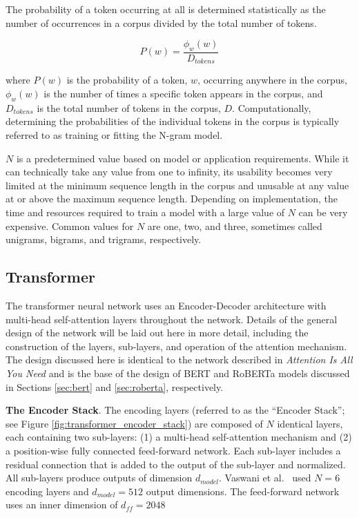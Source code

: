 \documentclass[12pt]{article}
\begin{document}
The probability of a token occurring at all is determined statistically as the number of occurrences in a corpus divided by the total number of tokens.

\begin{equation}\label{eq:ngram_prob_wj}
    P(w) = \frac{\phi_w(w)}{D_{tokens}}
\end{equation}

\noindent
where $P(w)$ is the probability of a token, $w$, occurring anywhere in the corpus, $\phi_w(w)$ is the number of times a specific token appears in the
corpus, and $D_{tokens}$ is the total number of tokens in the corpus, $D$. Computationally, determining the probabilities of the individual tokens in
the corpus is typically referred to as training or fitting the N-gram model.

$N$ is a predetermined value based on model or application requirements. While it can technically take any value from one to infinity, its usability
becomes very limited at the minimum sequence length in the corpus and unusable at any value at or above the maximum sequence length. Depending on
implementation, the time and resources required to train a model with a large value of $N$ can be very expensive. Common values for $N$ are one, two,
and three, sometimes called unigrams, bigrams, and trigrams, respectively.

\subsection{Transformer}\label{sec:transformer}
The transformer neural network uses an Encoder-Decoder architecture with multi-head self-attention layers throughout the network. Details of the
general design of the network will be laid out here in more detail, including the construction of the layers, sub-layers, and operation of the
attention mechanism. The design discussed here is identical to the network described in \textit{Attention Is All You Need}
\cite{vaswani_attention_2017} and is the base of the design of BERT and RoBERTa models discussed in Sections \ref{sec:bert} and \ref{sec:roberta},
respectively.

\textbf{The Encoder Stack}. The encoding layers (referred to as the ``Encoder Stack''; see Figure \ref{fig:transformer_encoder_stack}) are composed
of $N$ identical layers, each containing two sub-layers: (1) a multi-head self-attention mechanism and (2) a position-wise fully connected
feed-forward network. Each sub-layer includes a residual connection that is added to the output of the sub-layer and normalized. All sub-layers
produce outputs of dimension $d_{model}$. Vaswani et al.~\cite{vaswani_attention_2017} used $N=6$ encoding layers and $d_{model} = 512$ output
dimensions. The feed-forward network uses an inner dimension of $d_{ff} = 2048$
\end{document}
